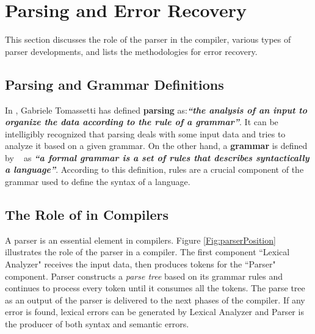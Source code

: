 \section{Parsing and Error Recovery}
\label{sec:bck_parser}
This section discusses the role of the parser in the compiler, various types of parser developments, and lists the methodologies for error recovery. 

\subsection{Parsing and Grammar Definitions}

In \cite{parsingGuide2017}, Gabriele Tomassetti has defined \textbf{parsing} as:{\it  \textbf{``the analysis of an input to organize the data according to the rule of a grammar''}}. It can be intelligibly recognized that parsing deals with some input data and tries to analyze it based on a given grammar. 
On the other hand, a \textbf{grammar} is defined by ~\cite{parsingGuide2017} as {\it \textbf{``a formal grammar is a set of rules that describes syntactically a language''}}. 
According to this definition, rules are a crucial component of the grammar used to define the syntax of a language.

\subsection{The Role of in Compilers}
A parser is an essential element in  compilers. 
{Figure \ref{Fig:parserPosition}} illustrates the role of the parser in a compiler. 
The first component ``Lexical Analyzer" receives the input data, then produces tokens for the ``Parser" component. Parser constructs a \emph{parse tree} based on its grammar rules and continues to process every token until it consumes all the tokens. 
The parse tree as an output of the parser is delivered to the next phases of the compiler. 
If any error is found, lexical errors can be generated by Lexical Analyzer and Parser is the producer of both syntax and semantic errors. 

